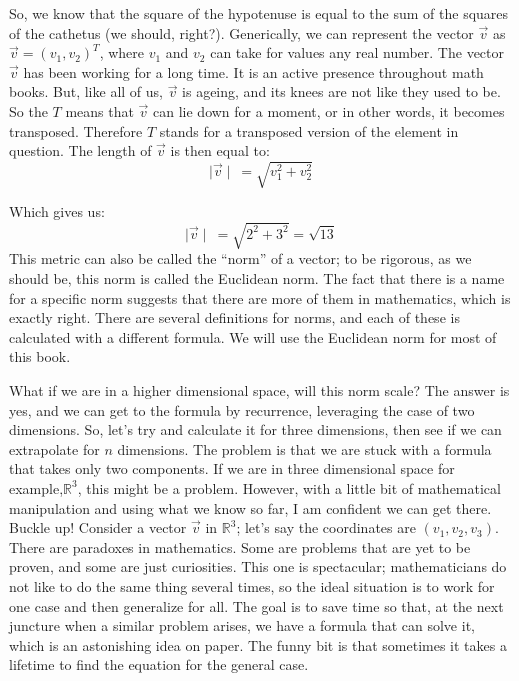 \documentclass[a4,12pt,twosided,openany]{memoir}
\begin{document}
So, we know that the square of the hypotenuse is equal to the sum of the squares of the cathetus  (we should, right?). Generically, we can represent the vector $\overrightarrow{v}$ as $\overrightarrow{v} = (v_1,v_2)^T$,  where $v_1$ and $v_2$ can take for values any real number. The vector $\overrightarrow{v}$ has been working for a long time. It is an active presence throughout math books. But, like all of us, $\overrightarrow{v}$ is ageing, and its knees are not like they used to be. So the $T$ means that $\overrightarrow{v}$ can lie down for a moment, or in other words, it becomes transposed. Therefore $T$ stands for a transposed version of the element in question. The length of $\overrightarrow{v}$ is then equal to:
\[\mid \overrightarrow{v} \mid\  =  \sqrt{v_1^{2} + v_2^{2} }\]
\par 
\indent
Which gives us:
\[\mid \overrightarrow{v} \mid\  =  \sqrt{2^{2} + 3^{2} } = \sqrt{13}\]
This metric can also be called the “norm” of a vector; to be rigorous, as we should be, this norm is called the Euclidean norm. The fact that there is a name for a specific norm suggests that there are more of them in mathematics, which is exactly right. There are several definitions for norms, and each of these is calculated with a different formula. We will use the Euclidean norm for most of this book. 
\par 
\indent
What if we are in a higher dimensional space, will this norm scale? The answer is yes, and we can get to the formula by recurrence, leveraging the case of two dimensions. So, let’s try and calculate it for three dimensions, then see if we can extrapolate for $n$ dimensions. The problem is that we are stuck with a formula that takes only two components. If we are in three dimensional space for example,$\mathbb{R}^3$, this might be a problem. However, with a little bit of mathematical manipulation and using what we know so far, I am confident we can get there. Buckle up! Consider a vector $\overrightarrow{v}$ in $\mathbb{R}^3$; let’s say the coordinates are $(v_1,v_2,v_3)$. There are paradoxes in mathematics. Some are problems that are yet  to be proven, and some are just curiosities. This one is spectacular; mathematicians do not like to do the same thing several times, so the ideal situation is to work for one case and then generalize for all. The goal is to save time so that, at the next juncture when a similar problem arises, we have a formula that can solve it, which is an astonishing idea on paper. The funny bit is that sometimes it takes a lifetime to find the equation for the general case. 
\end{document}
